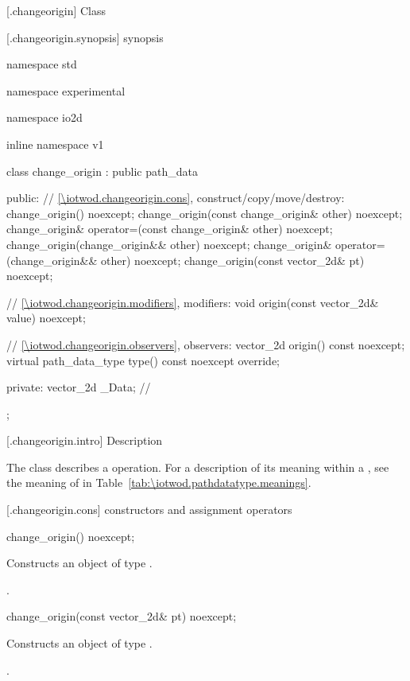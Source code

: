  [\iotwod.changeorigin] {Class }

 [\iotwod.changeorigin.synopsis] { synopsis}

\begin{codeblock}
namespace std { namespace experimental { namespace io2d { inline namespace v1 {
  class change_origin : public path_data {
  public:
    // \ref{\iotwod.changeorigin.cons}, construct/copy/move/destroy:
    change_origin() noexcept;
    change_origin(const change_origin& other) noexcept;
    change_origin& operator=(const change_origin& other) noexcept;
    change_origin(change_origin&& other) noexcept;
    change_origin& operator=(change_origin&& other) noexcept;
    change_origin(const vector_2d& pt) noexcept;

    // \ref{\iotwod.changeorigin.modifiers}, modifiers:
    void origin(const vector_2d& value) noexcept;

    // \ref{\iotwod.changeorigin.observers}, observers:
    vector_2d origin() const noexcept;
    virtual path_data_type type() const noexcept override;
    
  private:
    vector_2d _Data; // \expos
  };
} } } }
\end{codeblock}

 [\iotwod.changeorigin.intro] { Description}

\pnum
{}
The class  describes a  operation. For a description of its meaning within a , see the meaning of  in Table~\ref{tab:\iotwod.pathdatatype.meanings}.

 [\iotwod.changeorigin.cons] { constructors and assignment operators}

\begin{itemdecl}
    change_origin() noexcept;
\end{itemdecl}
\begin{itemdescr}
	\pnum
	\effects
	Constructs an object of type .
	
	\pnum
	\postconditions
	.
\end{itemdescr}

\begin{itemdecl}
    change_origin(const vector_2d& pt) noexcept;
\end{itemdecl}
\begin{itemdescr}
	\pnum
	\effects
	Constructs an object of type .
	
	\pnum
	\postconditions
	.
\end{itemdescr}

